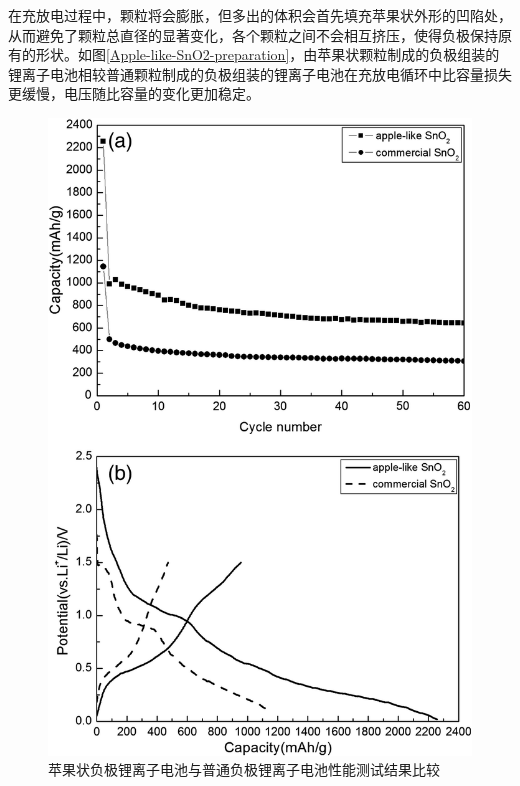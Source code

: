 \documentclass{assignment}
\begin{document}
\begin{da}
    在充放电过程中，颗粒将会膨胀，但多出的体积会首先填充苹果状外形的凹陷处，从而避免了颗粒总直径的显著变化，各个颗粒之间不会相互挤压，使得负极保持原有的形状。如图\ref{Apple-like-SnO2-preparation}，由苹果状颗粒制成的负极组装的锂离子电池相较普通颗粒制成的负极组装的锂离子电池在充放电循环中比容量损失更缓慢，电压随比容量的变化更加稳定。
    \begin{figure}[H]
        \centering
        \includegraphics[width=.5\columnwidth]{Apple-like-SnO2-performance.jpg}
        \caption{苹果状负极锂离子电池与普通负极锂离子电池性能测试结果比较}
        \label{Apple-like-SnO2-performance}
    \end{figure}
\end{da}
\end{document}

